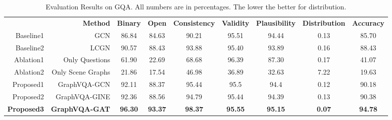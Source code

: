 \documentclass[11pt]{article}
\begin{document}
\begin{table*}[t]
\small
\begin{center}
\tabcolsep=0.06cm
\begin{adjustbox}{max width=\textwidth}
\begin{tabular}{rrccccccc}
\cmidrule[\heavyrulewidth]{1-9}
 & \textbf{Method} &  \textbf{Binary} & \textbf{Open}  & \textbf{Consistency} & \textbf{Validity} & \textbf{Plausibility} & \textbf{Distribution} & \textbf{Accuracy} \\ 
\cmidrule{1-9}
Baseline1 & GCN       & 86.84           &        84.63        &          90.21            &      95.51             &            94.44           &            0.13           &         85.70          \\
\cmidrule{1-9}
Baseline2 & LCGN       &        90.57         &       88.43         &          93.88            &     95.40              &        93.89               &         0.16              &          88.43         \\
\cmidrule{1-9}
Ablation1  & Only Questions 
& 61.90           &        22.69        &          68.68            &      96.39             &            87.30           &            0.17           &         41.07          \\
Ablation2  & Only Scene Graphs       & 21.86           &        17.54        &          46.98            &      36.89             &            32.63           &           7.22          &         19.63          \\
\cmidrule{1-9}
Proposed1 & GraphVQA-GCN       &        92.11         &         88.37       &       95.44               &           95.5        &           94.4            &           0.12            &       90.18            \\
Proposed2 & GraphVQA-GINE       &         92.36        &        88.56        &          94.79            &       95.44            &          94.39             &         0.13              &         90.38          \\
\bf Proposed3 & \textbf{GraphVQA-GAT}    & \textbf{96.30}  & \textbf{93.37} & \textbf{98.37}       & \textbf{95.55}    & \textbf{95.15}        & \textbf{0.07}         & \textbf{94.78}    \\ 
\cmidrule[\heavyrulewidth]{1-9}
\end{tabular}
\end{adjustbox}
\caption{
Evaluation Results on GQA. 
All numbers are in percentages. 
The lower the better for distribution. 
}
\label{tab:mainresult}
\end{center}
\vspace{-8mm}
\end{table*}
\end{document}
